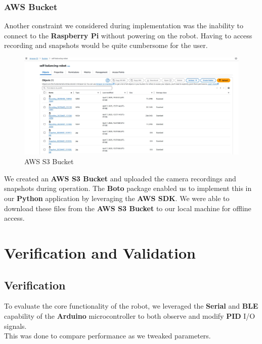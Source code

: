 \documentclass{article}
\begin{document}
\subsubsection{AWS Bucket}

\begin{minipage}{\linewidth}
    Another constraint we considered during implementation was the inability to
    connect to the \textbf{Raspberry Pi} without powering on the robot. Having to access recording and snapshots
    would be quite cumbersome for the user. \\
\end{minipage}

\begin{figure}[H]
    \centering
    \includegraphics[width=1\textwidth]{Figures/S3Bucket_Files.jpg}
    \caption{AWS S3 Bucket}
    \label{fig:s3_bucket}
\end{figure}

\begin{minipage}{\linewidth}
    We created an \textbf{AWS S3 Bucket} and uploaded the camera recordings and snapshots during operation.
    The \textbf{Boto} package enabled us to implement this in our \textbf{Python} application by leveraging the \textbf{AWS SDK}.
    We were able to download these files from the \textbf{AWS S3 Bucket} to our local machine for offline access.
\end{minipage}

\section{Verification and Validation}
\subsection{Verification}

\begin{minipage}{\linewidth}
    To evaluate the core functionality of the robot, we leveraged the \textbf{Serial} and \textbf{BLE} capability of the \textbf{Arduino} microcontroller to both observe and modify \textbf{PID} I/O signals. \\

    This was done to compare performance as we tweaked parameters. \\
\end{minipage}
\end{document}
